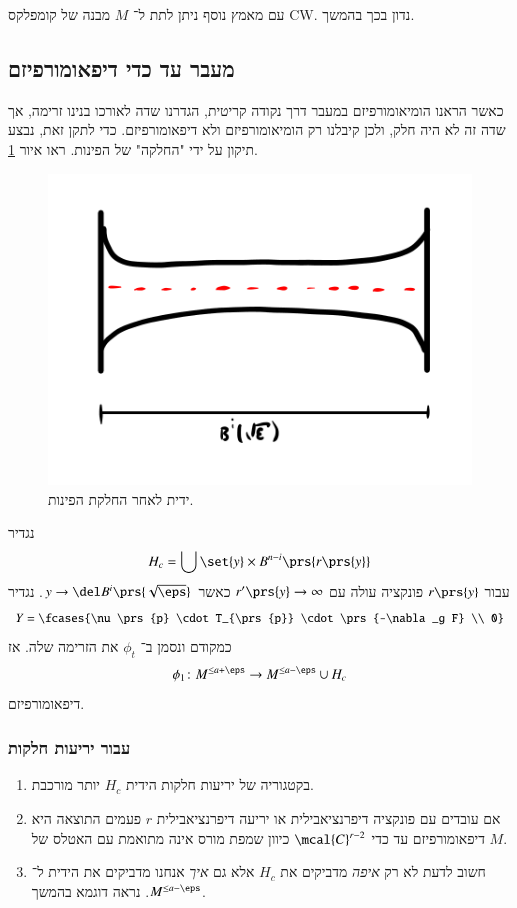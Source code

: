 \documentclass[a4paper,10pt,twoside,openany]{book}
\begin{document}
\begin{remark}
עם מאמץ נוסף ניתן לתת ל־%
$M$
מבנה של קומפלקס
\textenglish{CW}.
נדון בכך בהמשך.
\end{remark}

\subsection{מעבר עד כדי דיפאומורפיזם}

כאשר הראנו הומיאומורפיזם במעבר דרך נקודה קריטית, הגדרנו שדה לאורכו בנינו זרימה, אך שדה זה  לא היה חלק, ולכן קיבלנו רק הומיאומורפיזם ולא דיפאומורפיזם.
כדי לתקן זאת, נבצע תיקון על ידי "החלקה" של הפינות. ראו איור
\ref{3.3}.

\begin{figure}
\centering
\includegraphics[scale=0.5]{sources/3.3}
\caption{ידית לאחר החלקת הפינות.}
\label{3.3}
\end{figure}

נגדיר
\[H_c = \bigcup \set{y} \times B^{n-i}\prs{r\prs{y}}\]
עבור
$r\prs{y}$
פונקציה עולה עם
$r'\prs{y} \to \infty$
כאשר
$y \to \del B^i\prs{\sqrt{\eps}}$.
נגדיר
\[Y = \fcases{\nu\prs{p} \cdot T_{\prs{p}} \cdot \prs{-\nabla_g F} \\ 0}\]
כמקודם ונסמן ב־%
$\phi_t$
את הזרימה שלה.
אז
\[\phi_1 \colon M^{\leq a + \eps} \to M^{\leq a - \eps} \cup H_c\]
דיפאומורפיזם.

\subsubsection{עבור יריעות חלקות}

\begin{enumerate}
\item בקטגוריה של יריעות חלקות הידית
$H_c$
יותר מורכבת.
\item
 אם עובדים עם פונקציה דיפרנציאבילית או יריעה דיפרנציאבילית
$r$
פעמים התוצאה היא דיפאומורפיזם עד כדי
$\mcal{C}^{r-2}$
כיוון שמפת מורס אינה מתואמת עם האטלס של
$M$.
\item
חשוב לדעת לא רק
\emph{איפה}
מדביקים את
$H_c$
אלא גם
\emph{איך}
אנחנו מדביקים את הידית ל־%
$M^{\leq a - \eps}$.
נראה דוגמא בהמשך.
\end{enumerate}
\end{document}
